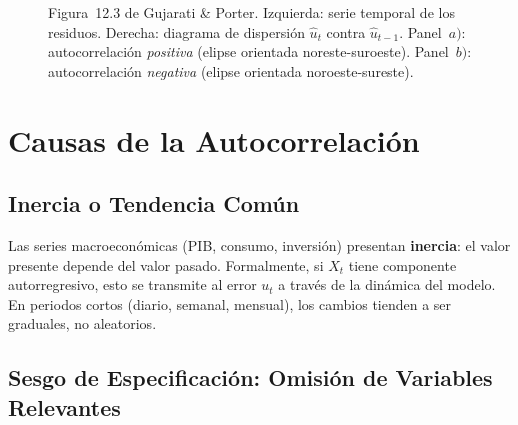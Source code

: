 \documentclass[12pt,a4paper]{article}
\theoremstyle{definition}
\theoremstyle{remark}
\begin{document}
\begin{figure}[H]
  \caption{Figura~12.3 de Gujarati \& Porter. Izquierda: serie temporal
    de los residuos. Derecha: diagrama de dispersión $\hat{u}_t$ contra
    $\hat{u}_{t-1}$. Panel~$a)$: autocorrelación \emph{positiva} (elipse
    orientada noreste-suroeste). Panel~$b)$: autocorrelación \emph{negativa}
    (elipse orientada noroeste-sureste).}
  \label{fig:scatter}
\end{figure}

\section{Causas de la Autocorrelación}
\label{sec:causas}

\subsection{Inercia o Tendencia Común}

Las series macroeconómicas (PIB, consumo, inversión) presentan
\textbf{inercia}: el valor presente depende del valor pasado. Formalmente,
si $X_t$ tiene componente autorregresivo, esto se transmite al error $u_t$
a través de la dinámica del modelo. En periodos cortos (diario, semanal,
mensual), los cambios tienden a ser graduales, no aleatorios.

\subsection{Sesgo de Especificación: Omisión de Variables Relevantes}
\end{document}
